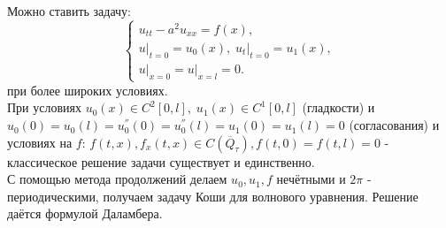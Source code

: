 \documentclass[../main.tex]{subfiles}
\begin{document}
Можно ставить задачу:
\begin{equation*}
	\begin{cases}
	u_{tt} - a^2u_{xx} = f(x), \\
	u\bigr|_{t = 0} = u_0(x), \; u_t\bigr|_{t = 0} = u_1(x), \\
	u\bigr|_{x = 0} = u\bigr|_{x = l} = 0.
	\end{cases}
\end{equation*}
при более широких условиях. \\
При условиях $u_0(x) \in C^2[0, l], \; u_1(x) \in C^1[0, l]$ (гладкости) и $u_0(0) = u_0(l) = u_0^{''}(0) = u_0^{''}(l) = u_1(0) = u_1(l) = 0$ (согласования) и условиях на $f$: $f(t, x), f_x(t, x) \in C(\overline{Q}_{\tau}), f(t, 0) = f(t, l) = 0$ - классическое решение задачи существует и единственно. \\
С помощью метода продолжений делаем $u_0, u_1, f$ нечётными и $2 \pi$ - периодическими, получаем задачу Коши для волнового уравнения. Решение даётся формулой Даламбера.
\end{document}
